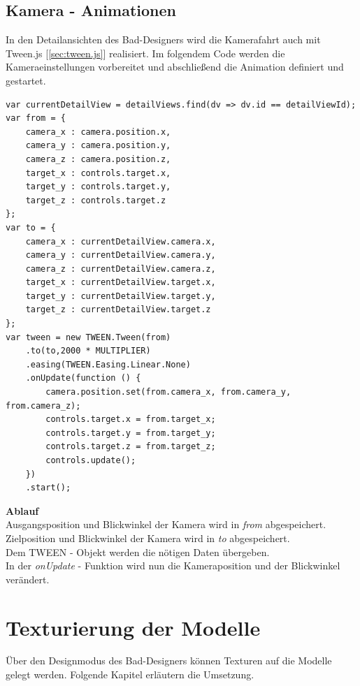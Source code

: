 \section{Kamera - Animationen}\label{sec:Kamera - Animationen}
In den Detailansichten des Bad-Designers wird die Kamerafahrt auch mit Tween.js [\ref{sec:tween.js}] realisiert.
Im folgendem Code werden die Kameraeinstellungen vorbereitet und abschließend die Animation definiert und gestartet.
\begin{lstlisting}
var currentDetailView = detailViews.find(dv => dv.id == detailViewId);
var from = {
    camera_x : camera.position.x,
    camera_y : camera.position.y,
    camera_z : camera.position.z,
    target_x : controls.target.x,
    target_y : controls.target.y,
    target_z : controls.target.z
};
var to = {
    camera_x : currentDetailView.camera.x,
    camera_y : currentDetailView.camera.y,
    camera_z : currentDetailView.camera.z,
    target_x : currentDetailView.target.x,
    target_y : currentDetailView.target.y,
    target_z : currentDetailView.target.z
};
var tween = new TWEEN.Tween(from)
    .to(to,2000 * MULTIPLIER)
    .easing(TWEEN.Easing.Linear.None)
    .onUpdate(function () {
        camera.position.set(from.camera_x, from.camera_y, from.camera_z);
        controls.target.x = from.target_x;
        controls.target.y = from.target_y;
        controls.target.z = from.target_z;
        controls.update();
    })
    .start();
\end{lstlisting}
\textbf{Ablauf} \\
Ausgangsposition und Blickwinkel der Kamera wird in \textit{from} abgespeichert. \\
Zielposition und Blickwinkel der Kamera wird in \textit{to} abgespeichert. \\
Dem TWEEN - Objekt werden die nötigen Daten übergeben. \\
In der \textit{onUpdate} - Funktion wird nun die Kameraposition und der Blickwinkel verändert.
\newpage
\chapter{Texturierung der Modelle}\label{sec:Texturierung der Modelle}
Über den Designmodus des Bad-Designers können Texturen auf die Modelle gelegt werden. Folgende Kapitel erläutern die Umsetzung.
